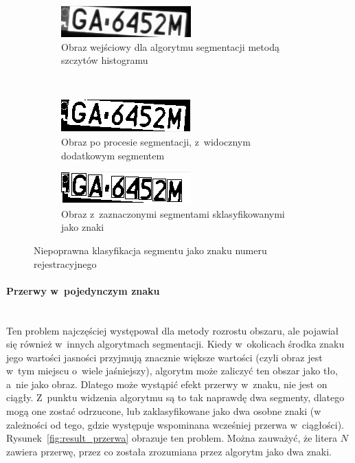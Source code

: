 \begin{figure}
  \centering
  \begin{subfigure}[b]{0.45\textwidth}
    \includegraphics[width=\textwidth]{img/result-euro-input}
    \caption{Obraz wejściowy dla algorytmu segmentacji metodą szczytów histogramu}
    \label{fig:result_euro_input}
  \end{subfigure}
  ~
  \begin{subfigure}[b]{0.45\textwidth}
    \includegraphics[width=\textwidth]{img/result-euro-bad}
    \caption{Obraz po procesie segmentacji, z~widocznym dodatkowym segmentem}
    \label{fig:result_euro_bad}
  \end{subfigure}
\begin{subfigure}[b]{0.45\textwidth}
    \includegraphics[width=\textwidth]{img/result-euro-output}
    \caption{Obraz z~zaznaczonymi segmentami sklasyfikowanymi jako znaki}
    \label{fig:result_euro_output}
  \end{subfigure}
  \caption{Niepoprawna klasyfikacja segmentu jako znaku numeru rejestracyjnego}
  \label{fig:result_euro}
\end{figure}

\paragraph{Przerwy w~pojedynczym znaku}\mbox{} \\
Ten problem najczęściej występował dla metody rozrostu obszaru, ale pojawiał się również w~innych algorytmach segmentacji. Kiedy w~okolicach środka znaku jego wartości jasności przyjmują znacznie większe wartości (czyli obraz jest w~tym miejscu o~wiele jaśniejszy), algorytm może zaliczyć ten obszar jako tło, a~nie jako obraz. Dlatego może wystąpić efekt przerwy w~znaku, nie jest on ciągły. Z~punktu widzenia algorytmu są to tak naprawdę dwa segmenty, dlatego mogą one zostać odrzucone, lub zaklasyfikowane jako dwa osobne znaki (w zależności od tego, gdzie występuje wspominana wcześniej przerwa w~ciągłości). Rysunek~\ref{fig:result_przerwa} obrazuje ten problem. Można zauważyć, że litera $N$ zawiera przerwę, przez co została zrozumiana przez algorytm jako dwa znaki.

